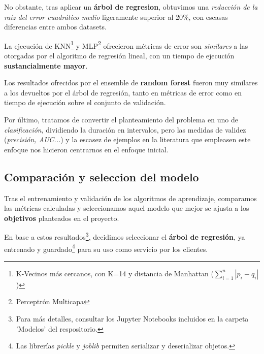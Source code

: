 No obstante, tras aplicar un \textbf{árbol de regresion},  obtuvimos una \textit{reducción de la raíz del error cuadrático medio} ligeramente superior al 20\%, con escasas diferencias entre ambos datasets.


La ejecución de KNN\footnote{K-Vecinos más cercanos, con K=14 y distancia de Manhattan (\(\sum_{i=1}^{n} |p_{i} - q_{i}|\))} y MLP\footnote{Perceptrón Multicapa} ofrecieron métricas de error son \textit{similares} a las otorgadas por el algoritmo de regresión lineal, con un tiempo de ejecución \textbf{sustancialmente mayor}.

Los resultados ofrecidos por el ensemble de \textbf{random forest} fueron muy similares a los devueltos por el árbol de regresión, tanto en métricas de error como en tiempo de ejecución sobre el conjunto de validación.

Por último, tratamos de convertir el planteamiento del problema en uno de \textit{clasificación}, dividiendo la duración en intervalos, pero las medidas de validez (\textit{precisión, AUC...}) y la escasez de ejemplos en la literatura que empleasen este enfoque nos hicieron centrarnos en el enfoque inicial.


\subsection{Comparación y seleccion del modelo}

Tras el entrenamiento y validación de los algoritmos de aprendizaje, comparamos las métricas calculadas y seleccionamos aquel modelo que mejor se ajusta a los \textbf{objetivos} planteados en el proyecto.


En base a estos resultados\footnote{Para más detalles, consultar los Jupyter Notebooks incluidos en la carpeta 'Modelos' del respositorio.}, decidimos seleccionar el \textbf{árbol de regresión}, ya entrenado y guardado\footnote{Las librerías \textit{pickle} y \textit{joblib} permiten serializar y deserializar objetos.} para su uso como servicio por los clientes.


